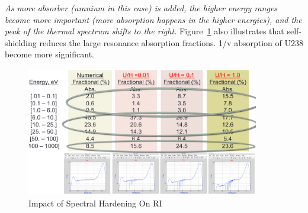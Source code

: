 \documentclass{school-22.211-notes}
\begin{document}
\textit{As more absorber (uranium in this case) is added, the higher energy ranges become more important (more absorption happens in the higher energies), and the peak of the thermal spectrum shifts to the right.} Figure~\ref{spectral-hardening} also illustrates that self-shielding reduces the large resonance absorption fractions. 1/v absorption of U238 become more significant. 
\begin{figure}
  \centering
  \includegraphics[width=4in]{images/spectral-hardening.png}
  \caption{Impact of Spectral Hardening On RI} \label{spectral-hardening}
\end{figure}
\end{document}

